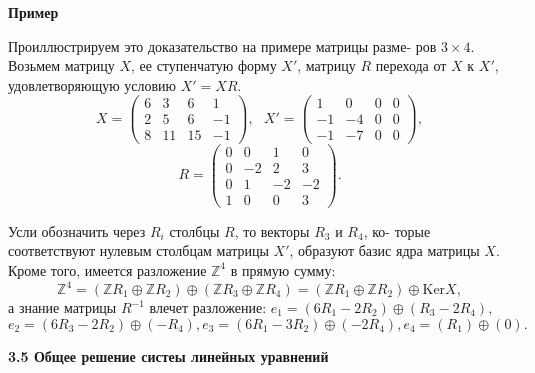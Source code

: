 \documentclass{mai_book}
\begin{document}
	\noindent
	{\bf Пример}
	
	Проиллюстрируем это доказательство на примере матрицы разме-\linebreak
	ров $3\times 4$. Возьмем матрицу $X$, ее ступенчатую форму $X'$, матрицу $R$\linebreak
	перехода от $X$ к $X'$, удовлетворяющую условию $X' = XR$.
	$$X = \begin{pmatrix} 6 & 3 & 6 & 1 \\ 2 & 5 & 6 & -1 \\ 8 & 11 & 15 & -1 \end{pmatrix}, \ \ \ X' = \begin{pmatrix} 1 & 0 & 0 & 0 \\ -1 & -4 & 0 & 0 \\ -1 & -7 & 0 & 0 \end{pmatrix},$$
	$$R = \begin{pmatrix} 0 & 0 & 1 & 0 \\ 0 & -2 & 2 & 3 \\ 0 & 1 & -2 & -2 \\ 1 & 0 & 0 & 3 \end{pmatrix}.$$
	
	\pagebreak
	
	
	Усли обозначить через $R_i$ столбцы $R$, то векторы $R_3$ и $R_4$, ко-\linebreak
	торые соответствуют нулевым столбцам матрицы $X'$, образуют базис\linebreak
	ядра матрицы $X$. Кроме того, имеется разложение ${\mathbb Z}^4$ в прямую сумму:\linebreak
	$${\mathbb Z}^4 = (\mathbb Z R_1\oplus \mathbb Z R_2) \oplus (\mathbb Z R_3\oplus \mathbb Z R_4) = (\mathbb Z R_1\oplus \mathbb Z R_2) \oplus \text{Ker}X,$$
	а знание матрицы $R^{-1}$ влечет разложение: $e_1 = (6R_1 - 2R_2) \oplus (R_3 - 2R_4),$\linebreak
	$e_2 = (6R_3 - 2R_2) \oplus (-R_4), e_3 = (6R_1 - 3R_2) \oplus (-2R_4), e_4 = (R_1) \oplus (0).$
	
	\noindent
	{\large {\bf 3.5 Общее решение систеы линейных уравнений}}
	
\end{document}
